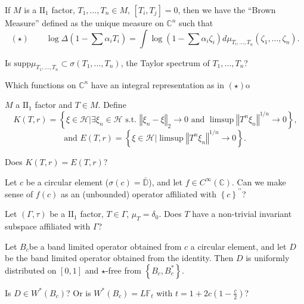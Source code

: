 \documentclass[12pt,letterpaper, reqno]{amsart}
\begin{document}
If $M$ is a $\textrm{II}_{1}$ factor, $T_{1},\ldots,T_{n}\in M$,
$[T_{i},T_{j}]=0$, then we have the {}``Brown Measure'' defined
as the unique measure on $\mathbb{C}^{n}$ such that \[
(\star)\qquad\log\Delta(1-\sum\alpha_{i}T_{i})=\int\log(1-\sum\alpha_{i}\zeta_{i})d\mu_{T_{!},\ldots,T_{n}}(\zeta_{1},\ldots,\zeta_{n})\textrm{.}\]

\begin{problem}
 Is $\textrm{supp}\mu_{T_{1},\ldots,T_{n}}\subset\sigma(T_{1},\ldots,T_{n})$,
the Taylor spectrum of $T_{1},\ldots,T_{n}$?
\end{problem}

\begin{problem}
 Which functions on $\mathbb{C}^{n}$ have an
integral representation as in $(\star)$o
\end{problem}

\begin{problemblock}
$M$ a $\textrm{II}_{1}$ factor and $T\in M$.
Define\[
K(T,r)=\left\{ \xi\in\mathcal{H}\vert\exists\xi_{n}\in\mathcal{H}\textrm{ s.t. }\left\Vert \xi_{n}-\xi\right\Vert _{2}\rightarrow0\textrm{ and }\limsup\left\Vert T^{n}\xi_{n}\right\Vert ^{1/n}\rightarrow0\right\} \textrm{,}\]
 \[
\textrm{and }E(T,r)=\left\{ \xi\in\mathcal{H}\vert\limsup\left\Vert T^{n}\xi_{n}\right\Vert ^{1/n}\rightarrow0\right\} \textrm{.}\]
\begin{problem}
Does $K(T,r)=E(T,r)$?
\end{problem}
\begin{comment}The $DT$ quasinilpotent operator may be a
counterexample.
\end{comment}
\end{problemblock}

\begin{problem}
 Let $c$ be a circular element ($\sigma(c)=\bar{\mathbb{D}}$),
and let $f\in C^{\infty}(\mathbb{C})$. Can we make sense of $f(c)$
as an (unbounded) operator affiliated with $\left\{ c\right\} ^{\prime\prime}$?
\end{problem}

\begin{problem}
 Let $(\Gamma,\tau)$ be a $\textrm{II}_{1}$
factor, $T\in\Gamma$, $\mu_{T}=\delta_{0}$. Does $T$ have a non-trivial
invariant subspace affiliated with $\Gamma$?
\end{problem}

\begin{problem}
 Let $B_{c}$be a band limited operator obtained
from $c$ a circular element, and let $D$ be the band limited operator
obtained from the identity. Then $D$ is uniformly distributed on
$[0,1]$ and $\star$-free from $\left\{ B_{c},B_{c}^{*}\right\} $.

Is $D\in W^{*}(B_{c})$? Or is $W^{*}(B_{c})=L\mathbb{F}_{t}$ with
$t=1+2c(1-\frac{c}{2})$?
\end{problem}
\end{document}
